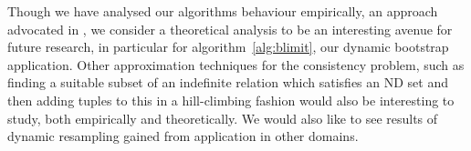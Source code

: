 \medskip

Though we
have analysed our algorithms behaviour empirically, an approach advocated in
\cite{hoo94}, we consider a theoretical analysis to be an interesting
avenue for future 
research, in particular for algorithm~\ref{alg:blimit}, our dynamic
bootstrap application. Other approximation techniques for the
consistency problem, such as finding a suitable subset of an
indefinite relation which satisfies an ND set and then adding tuples
to this in a hill-climbing fashion would also be interesting to study,
both empirically and theoretically. We would also like to see results
of dynamic resampling gained from application in other domains.



